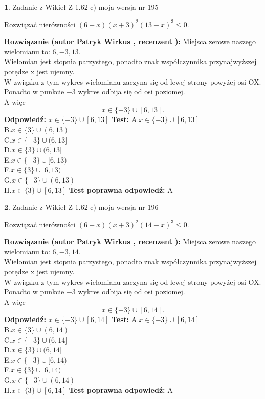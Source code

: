 \documentclass[12pt, a4paper]{article}
\theoremstyle{definition} %
\newtheorem{zad}{}
\newcommand{\zadStart}[1]{\begin{zad}#1\newline}
\newcommand{\zadStop}{\end{zad}}
\newcommand{\rozwStart}[2]{\noindent \textbf{Rozwiązanie (autor #1 , recenzent #2): }\newline}
\newcommand{\rozwStop}{\newline}
\newcommand{\odpStart}{\noindent \textbf{Odpowiedź:}\newline}
\newcommand{\odpStop}{\newline}
\newcommand{\testStart}{\noindent \textbf{Test:}\newline}
\newcommand{\testStop}{\newline}
\newcommand{\kluczStart}{\noindent \textbf{Test poprawna odpowiedź:}\newline}
\newcommand{\kluczStop}{\newline}
\begin{document}
\zadStart{Zadanie z Wikieł Z 1.62 c) moja wersja nr 195}

Rozwiązać nierówności $(6-x)(x+3)^{2}(13-x)^{3}\le0$.
\zadStop
\rozwStart{Patryk Wirkus}{}
Miejsca zerowe naszego wielomianu to: $6, -3, 13$.\\
Wielomian jest stopnia parzystego, ponadto znak współczynnika przy\linebreak najwyższej potędze x jest ujemny.\\ W związku z tym wykres wielomianu zaczyna się od lewej strony powyżej osi OX.\\
Ponadto w punkcie $-3$ wykres odbija się od osi poziomej.\\
A więc $$x \in \{-3\} \cup [6,13].$$
\rozwStop
\odpStart
$x \in \{-3\} \cup [6,13]$
\odpStop
\testStart
A.$x \in \{-3\} \cup [6,13]$\\
B.$x \in \{3\} \cup (6,13)$\\
C.$x \in \{-3\} \cup (6,13]$\\
D.$x \in \{3\} \cup (6,13]$\\
E.$x \in \{-3\} \cup [6,13)$\\
F.$x \in \{3\} \cup [6,13)$\\
G.$x \in \{-3\} \cup (6,13)$\\
H.$x \in \{3\} \cup [6,13]$
\testStop
\kluczStart
A
\kluczStop



\zadStart{Zadanie z Wikieł Z 1.62 c) moja wersja nr 196}

Rozwiązać nierówności $(6-x)(x+3)^{2}(14-x)^{3}\le0$.
\zadStop
\rozwStart{Patryk Wirkus}{}
Miejsca zerowe naszego wielomianu to: $6, -3, 14$.\\
Wielomian jest stopnia parzystego, ponadto znak współczynnika przy\linebreak najwyższej potędze x jest ujemny.\\ W związku z tym wykres wielomianu zaczyna się od lewej strony powyżej osi OX.\\
Ponadto w punkcie $-3$ wykres odbija się od osi poziomej.\\
A więc $$x \in \{-3\} \cup [6,14].$$
\rozwStop
\odpStart
$x \in \{-3\} \cup [6,14]$
\odpStop
\testStart
A.$x \in \{-3\} \cup [6,14]$\\
B.$x \in \{3\} \cup (6,14)$\\
C.$x \in \{-3\} \cup (6,14]$\\
D.$x \in \{3\} \cup (6,14]$\\
E.$x \in \{-3\} \cup [6,14)$\\
F.$x \in \{3\} \cup [6,14)$\\
G.$x \in \{-3\} \cup (6,14)$\\
H.$x \in \{3\} \cup [6,14]$
\testStop
\kluczStart
A
\kluczStop
\end{document}
